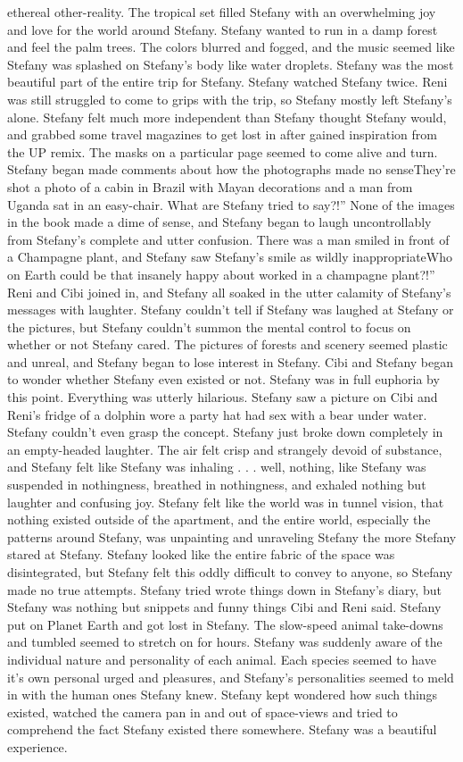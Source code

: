 \documentclass[12pt]{book}
\begin{document}
ethereal other-reality. The tropical set filled Stefany with an overwhelming joy and love for the world around Stefany. Stefany wanted to run in a damp forest and feel the palm trees. The colors blurred and fogged, and the music seemed like Stefany was splashed on Stefany's body like water droplets. Stefany was the most beautiful part of the entire trip for Stefany. Stefany watched Stefany twice. Reni was still struggled to come to grips with the trip, so Stefany mostly left Stefany's alone. Stefany felt much more independent than Stefany thought Stefany would, and grabbed some travel magazines to get lost in after gained inspiration from the UP remix. The masks on a particular page seemed to come alive and turn. Stefany began made comments about how the photographs made no senseThey're shot a photo of a cabin in Brazil with Mayan decorations and a man from Uganda sat in an easy-chair. What are Stefany tried to say?!'' None of the images in the book made a dime of sense, and Stefany began to laugh uncontrollably from Stefany's complete and utter confusion. There was a man smiled in front of a Champagne plant, and Stefany saw Stefany's smile as wildly inappropriateWho on Earth could be that insanely happy about worked in a champagne plant?!'' Reni and Cibi joined in, and Stefany all soaked in the utter calamity of Stefany's messages with laughter. Stefany couldn't tell if Stefany was laughed at Stefany or the pictures, but Stefany couldn't summon the mental control to focus on whether or not Stefany cared. The pictures of forests and scenery seemed plastic and unreal, and Stefany began to lose interest in Stefany. Cibi and Stefany began to wonder whether Stefany even existed or not. Stefany was in full euphoria by this point. Everything was utterly hilarious. Stefany saw a picture on Cibi and Reni's fridge of a dolphin wore a party hat had sex with a bear under water. Stefany couldn't even grasp the concept. Stefany just broke down completely in an empty-headed laughter. The air felt crisp and strangely devoid of substance, and Stefany felt like Stefany was inhaling . . .  well, nothing, like Stefany was suspended in nothingness, breathed in nothingness, and exhaled nothing but laughter and confusing joy. Stefany felt like the world was in tunnel vision, that nothing existed outside of the apartment, and the entire world, especially the patterns around Stefany, was unpainting and unraveling Stefany the more Stefany stared at Stefany. Stefany looked like the entire fabric of the space was disintegrated, but Stefany felt this oddly difficult to convey to anyone, so Stefany made no true attempts. Stefany tried wrote things down in Stefany's diary, but Stefany was nothing but snippets and funny things Cibi and Reni said. Stefany put on Planet Earth and got lost in Stefany. The slow-speed animal take-downs and tumbled seemed to stretch on for hours. Stefany was suddenly aware of the individual nature and personality of each animal. Each species seemed to have it's own personal urged and pleasures, and Stefany's personalities seemed to meld in with the human ones Stefany knew. Stefany kept wondered how such things existed, watched the camera pan in and out of space-views and tried to comprehend the fact Stefany existed there somewhere. Stefany was a beautiful experience. 
\end{document}
